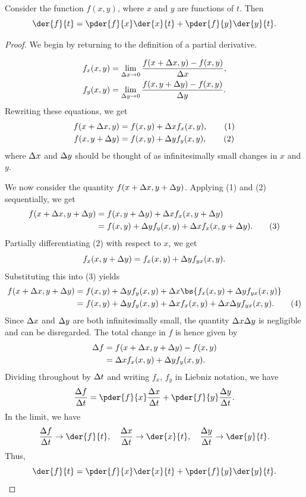 \begin{proposition}\label{prop:MCR}
    Consider the function $f(x, y)$, where $x$ and $y$ are functions of $t$. Then \[\der{f}{t} = \pder{f}{x} \der{x}{t} + \pder{f}{y} \der{y}{t}.\]
\end{proposition}
\begin{proof}
    We begin by returning to the definition of a partial derivative.

    \begin{align*}
        f_x(x, y) &= \lim_{\Delta x \to 0} \frac{f(x + \Delta x, y) - f(x, y)}{\Delta x},\\
        f_y(x, y) &= \lim_{\Delta y \to 0} \frac{f(x, y + \Delta y) - f(x, y)}{\Delta y}.
    \end{align*}
    Rewriting these equations, we get
    \begin{align*}
        f(x + \Delta x, y) &= f(x, y) + \Delta x f_x(x, y), \tag{1}\\
        f(x, y + \Delta y) &= f(x, y) + \Delta y f_y(x, y), \tag{2}
    \end{align*}
    where $\Delta x$ and $\Delta y$ should be thought of as infinitesimally small changes in $x$ and $y$.

    We now consider the quantity $f(x + \Delta x, y + \Delta y)$. Applying (1) and (2) sequentially, we get
    \begin{align*}
        f(x + \Delta x, y + \Delta y) &= f(x, y + \Delta y) + \Delta x f_x(x, y + \Delta y)\\
        &= f(x, y) + \Delta y f_y(x,y) + \Delta x f_x(x, y + \Delta y). \tag{3}
    \end{align*}
    Partially differentiating (2) with respect to $x$, we get \[f_x(x, y + \Delta y) = f_x(x, y) + \Delta y f_{yx}(x, y).\] Substituting this into (3) yields
    \begin{align*}
        f(x + \D x, y + \D y) &= f(x, y) + \D y f_y(x,y) + \D x \bs{f_x(x, y) + \D y f_{yx}(x, y)}\\
        &= f(x, y) + \D y f_y(x,y) + \D x f_x(x, y) + \D x\D y f_{yx}(x, y). \tag{4}
    \end{align*}
    Since $\Delta x$ and $\Delta y$ are both infinitesimally small, the quantity $\Delta x \Delta y$ is negligible and can be disregarded. The total change in $f$ is hence given by
    \begin{align*}
        \Delta f &= f(x + \Delta x, y + \Delta y) - f(x, y)\\
        &= \Delta x f_x(x, y) + \Delta y f_y(x,y).
    \end{align*}
    Dividing throughout by $\Delta t$ and writing $f_x$, $f_y$ in Liebniz notation, we have \[\frac{\D f}{\D t} = \pder{f}{x} \frac{\D x}{\D t} + \pder{f}{y} \frac{\D y}{\D t}.\] In the limit, we have \[\frac{\D f}{\D t} \to \der{f}{t}, \quad \frac{\D x}{\D t} \to \der{x}{t}, \quad \frac{\D y}{\D t} \to \der{y}{t}.\] Thus, \[\der{f}{t} = \pder{f}{x} \der{x}{t} + \pder{f}{y} \der{y}{t}.\]
\end{proof}

